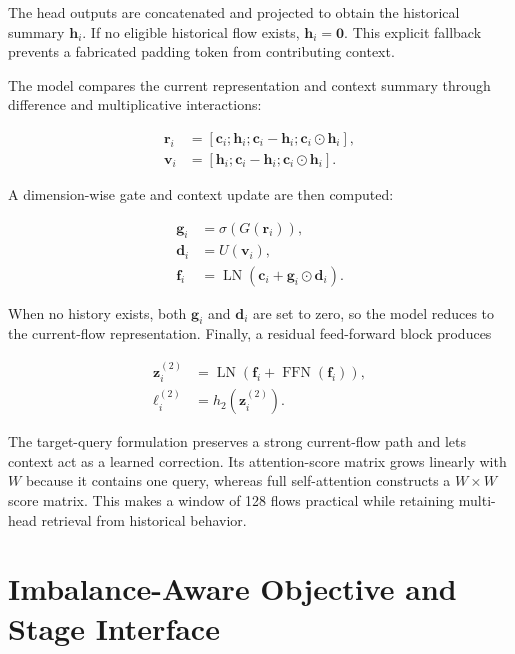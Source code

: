 \documentclass[11pt,fleqn]{report}
\begin{document}
The head outputs are concatenated and projected to obtain the historical
summary $\mathbf{h}_i$. If no eligible historical flow exists,
$\mathbf{h}_i=\mathbf{0}$. This explicit fallback prevents a fabricated
padding token from contributing context.

The model compares the current representation and context summary through
difference and multiplicative interactions:

\begin{align}
    \mathbf{r}_i
    &=[\mathbf{c}_i;\mathbf{h}_i;
       \mathbf{c}_i-\mathbf{h}_i;
       \mathbf{c}_i\odot\mathbf{h}_i],\\
    \mathbf{v}_i
    &=[\mathbf{h}_i;
       \mathbf{c}_i-\mathbf{h}_i;
       \mathbf{c}_i\odot\mathbf{h}_i].
    \label{eq:target_context_interactions}
\end{align}

A dimension-wise gate and context update are then computed:

\begin{align}
    \mathbf{g}_i&=\sigma(G(\mathbf{r}_i)),\\
    \mathbf{d}_i&=U(\mathbf{v}_i),\\
    \mathbf{f}_i&=\operatorname{LN}
      \left(\mathbf{c}_i+\mathbf{g}_i\odot\mathbf{d}_i\right).
    \label{eq:gated_context_update}
\end{align}

When no history exists, both $\mathbf{g}_i$ and $\mathbf{d}_i$ are set to zero,
so the model reduces to the current-flow representation. Finally, a residual
feed-forward block produces

\begin{align}
    \mathbf{z}^{(2)}_i
    &=\operatorname{LN}
      \left(
        \mathbf{f}_i+\operatorname{FFN}(\mathbf{f}_i)
      \right),\\
    \boldsymbol{\ell}^{(2)}_i
    &=h_2(\mathbf{z}^{(2)}_i).
    \label{eq:stage2_output}
\end{align}

The target-query formulation preserves a strong current-flow path and lets
context act as a learned correction. Its attention-score matrix grows linearly
with $W$ because it contains one query, whereas full self-attention constructs
a $W\times W$ score matrix. This makes a window of 128 flows practical while
retaining multi-head retrieval from historical behavior.
\section{Imbalance-Aware Objective and Stage Interface}
\label{subsec:method_training}
\end{document}
